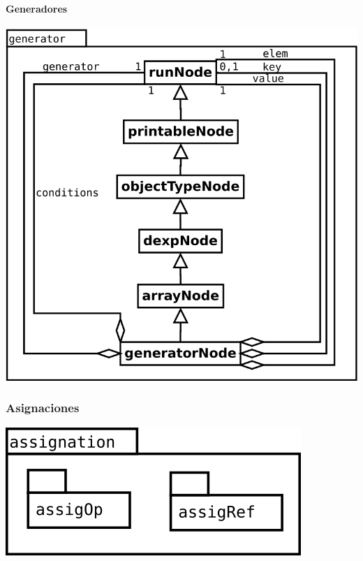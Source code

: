 \paragraph {Generadores}
\begin{center}
\includegraphics[scale=0.4]{generator.png} \\
\end{center}
\pagebreak
\subsubsection {Asignaciones}
\begin{center}
\includegraphics[scale=0.4]{assig-package.png} \\
\end{center}

